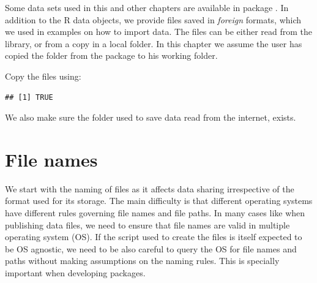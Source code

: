 \documentclass[krantz2]{krantz}\usepackage{knitr}%
\begin{document}
\begin{infobox}
Some data sets used in this and other chapters are available in package . In addition to the
R data objects, we provide files saved in \emph{foreign} formats, which we used in examples on how to import data. The files can be either read from the \Rlang library, or from a copy in a local folder. In this chapter we
assume the user has copied the folder  from the package to his working folder.

Copy the files using:

\begin{knitrout}\footnotesize
{}\color{fgcolor}\begin{kframe}
\begin{alltt}
 \hlkwb{<-} \hlstd{(}\hlstd{,}  \hlstd{=} \hlstd{)}
 \hlstd{,}  \hlstd{=} \hlstd{,}  \hlstd{=} \hlstd{)}
\end{alltt}
\begin{verbatim}
## [1] TRUE
\end{verbatim}
\end{kframe}
\end{knitrout}

We also make sure the folder used to save data read from the internet, exists.

\begin{knitrout}\footnotesize
{}\color{fgcolor}\begin{kframe}
\begin{alltt}
 \hlkwb{=} 
 \hlstd{(}\hlopt{!}
\hlstd{\}}
\end{alltt}
\end{kframe}
\end{knitrout}
\end{infobox}

\section{File names}\label{sec:files:filenames}

We start with the naming of files as it affects data sharing irrespective of the format used for its storage. The main difficulty is that different operating systems have different rules governing file names and file paths. In many cases like when publishing data files, we need to ensure that file names are valid in multiple operating system (OS). If the script used to create the files is itself expected to be OS agnostic, we need to be also careful to query the OS for file names and paths without making assumptions on the naming rules. This is specially important when developing \Rlang packages.
\end{document}
